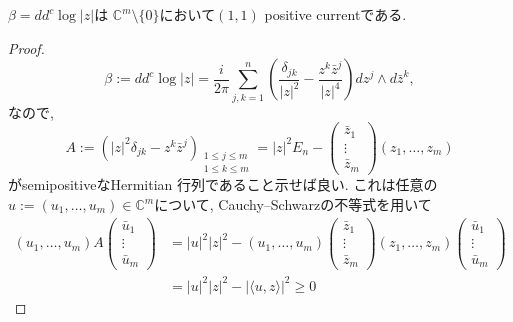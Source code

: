 \begin{tcolorbox}[mybox]
\begin{lem}
\label{lem-H-5.17}
$\beta=dd^c\log|z|$は $\mathbb{C}^m\setminus\{0\}$において$(1,1)$ positive currentである. 
\end{lem}
\end{tcolorbox}
\begin{proof}
\begin{equation*}
\beta
:=
dd^c\log|z|
=
\frac{i}{2\pi}
\sum_{j,k=1}^n
\left(
\frac{\delta_{jk}}{|z|^2}
-
\frac{z^k\bar z^j}{|z|^4}
\right)
dz^j\wedge d\bar z^k,
\end{equation*}
なので, 
\begin{equation*}
A
:=
\left(
|z|^2\delta_{jk}-z^k\bar z^j
\right)_{\substack{1\leq j\leq m\\1\leq k\leq m}}
=
|z|^2E_n
-
\begin{pmatrix}
\bar z_1\\
\vdots\\
\bar z_m
\end{pmatrix}
(z_1,\ldots,z_m)
\end{equation*}
がsemipositiveなHermitian 行列であること示せば良い. 
これは任意の$u:=(u_1,\ldots,u_m)\in\mathbb{C}^m$について, Cauchy--Schwarzの不等式を用いて
\begin{align*}
(u_1,\ldots,u_m)
A
\begin{pmatrix}
\bar u_1\\
\vdots\\
\bar u_m
\end{pmatrix}
&=
|u|^2|z|^2
-
(u_1,\ldots,u_m)
\begin{pmatrix}
\bar z_1\\
\vdots\\
\bar z_m
\end{pmatrix}
(z_1,\ldots,z_m)
\begin{pmatrix}
\bar u_1\\
\vdots\\
\bar u_m
\end{pmatrix}\\
&=
|u|^2|z|^2
-
|\langle u,z\rangle|^2
\geq0
\end{align*}
\end{proof}

